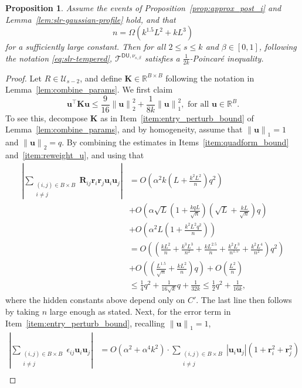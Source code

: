 \documentclass[11pt]{article}
\newtheorem{proposition}{Proposition}
\newcommand{\norm}[1]{\left\lVert#1\right\rVert}
\newcommand{\eps}{\epsilon}
\newcommand{\R}{\mathbb{R}}
\newcommand{\1}{\mathbf{1}}
\newcommand{\0}{\mathbf{0}}
\newcommand{\Par}[1]{\left(#1\right)}
\newcommand{\Abs}[1]{\left|#1\right|}
\newcommand{\mk}{{\mathbf{K}}}
\newcommand{\mr}{{\mathbf{R}}}
\newcommand{\vr}{{\mathbf{r}}}
\newcommand{\vu}{{\mathbf{u}}}
\newcommand{\calT}{{\mathcal{T}}}
\newcommand{\calU}{{\mathcal{U}}}
\newcommand{\TDU}[1]{\calT^{\mathsf{DU}, #1}}
\begin{document}
\begin{proposition}\label{prop:slr-exact-link-profile}
Assume the events of Proposition~\ref{prop:approx_post_i} and Lemma~\ref{lem:slr-gaussian-profile} hold, and that 
\[n = \Omega\Par{k^{1.5} L^2 + kL^3}\]
for a sufficiently large constant. Then for all $2 \le s \le k$ and $\beta \in [0, 1]$, following the notation \eqref{eq:slr-tempered}, $\TDU{\nu_{s,\beta}}$ satisfies a $\frac 1 {2k}$-Poincar\'e inequality.
\end{proposition}
\begin{proof}
Let $R \in \calU_{s - 2}$, and define $\mk \in \R^{B \times B}$ following the notation in Lemma~\ref{lem:combine_params}. We first claim 
\begin{equation}\label{eq:quadform_bound_slr}\vu^\top \mk \vu \le \frac 9 {16} \norm{\vu}_2^2 + \frac 1 {8k}\norm{\vu}_1^2, \text{ for all } \vu \in \R^B. \end{equation}
To see this, decompose $\mk$ as in Item~\ref{item:entry_perturb_bound} of Lemma~\ref{lem:combine_params}, and by homogeneity, assume that $\norm{\vu}_1 = 1$ and $\norm{\vu}_2 = q$. By combining the estimates in Items~\ref{item:quadform_bound} and~\ref{item:reweight_u}, and using that 
\begin{align*}
\Abs{\sum_{\substack{(i, j) \in B \times B \\ i \neq j}} \mr_{ij}\vr_i\vr_j \vu_i\vu_j } &= O\Par{\alpha^2 k\Par{L + \frac{k^2 L^2}{n}} q^2} \\
&+ O\Par{\alpha \sqrt{L}\Par{1 + \frac{kqL}{\sqrt n}}\Par{\sqrt L + \frac{kL}{\sqrt n}} q} \\
&+ O\Par{\alpha^2 L\Par{1 + \frac{k^2 L^2 q^2}{n}}} \\
&= O\Par{\Par{\frac{kL^2}{n} + \frac{k^3 L^3}{n^2} + \frac{k L^{2.5}}{n} + \frac{k^2 L^{3}}{n^{1.5}} + \frac{k^2 L^4}{n^2}} q^2} \\
&+ O\Par{\Par{\frac{L^{1.5}}{\sqrt n} + \frac{k L^{2}}{n}}q} + O\Par{\frac{L^2}{n}} \\
&\le \frac 1 {4} q^2 + \frac 1 {16\sqrt k} q + \frac 1 {32k} \le \frac 1 {2} q^2 + \frac 1 {16k},
\end{align*}
where the hidden constants above depend only on $C'$. The last line then follows by taking $n$ large enough as stated. Next, for the error term in Item~\ref{item:entry_perturb_bound}, recalling $\norm{\vu}_1 = 1$,
\begin{equation}\label{eq:error_quadform}
\begin{aligned}\Abs{\sum_{\substack{(i, j) \in B \times B \\ i \neq j}} \eps_{ij} \vu_i\vu_j} &= O\Par{\alpha^2 + \alpha^4k^2} \cdot \sum_{\substack{(i, j) \in B \times B \\ i \neq j}} |\vu_i\vu_j| \Par{1 + \vr_i^2 + \vr_j^2} \\

\end{aligned}
\end{equation}
\end{proof}
\end{document}
